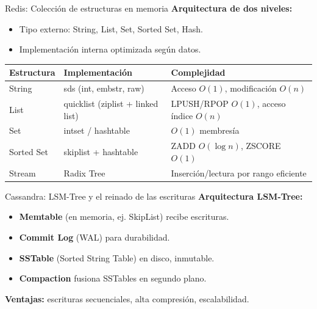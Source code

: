 \documentclass[aspectratio=169, 10pt, xcolor=table]{beamer}
\begin{document}
\begin{frame}{Redis: Colección de estructuras en memoria}
    \textbf{Arquitectura de dos niveles:}
    \begin{itemize}
        \item Tipo externo: String, List, Set, Sorted Set, Hash.
        \item Implementación interna optimizada según datos.
    \end{itemize}
    \begin{table}
        \centering
        \begin{tabular}{l|l|l}
            \toprule
            \textbf{Estructura} & \textbf{Implementación} & \textbf{Complejidad} \\
            \midrule
            String & sds (int, embstr, raw) & Acceso $O(1)$, modificación $O(n)$ \\
            List & quicklist (ziplist + linked list) & LPUSH/RPOP $O(1)$, acceso índice $O(n)$ \\
            Set & intset / hashtable & $O(1)$ membresía \\
            Sorted Set & skiplist + hashtable & ZADD $O(\log n)$, ZSCORE $O(1)$ \\
            Stream & Radix Tree & Inserción/lectura por rango eficiente \\
            \bottomrule
        \end{tabular}
    \end{table}
\end{frame}

\begin{frame}{Cassandra: LSM-Tree y el reinado de las escrituras}
    \textbf{Arquitectura LSM-Tree:}
    \begin{itemize}
        \item \textbf{Memtable} (en memoria, ej. SkipList) recibe escrituras.
        \item \textbf{Commit Log} (WAL) para durabilidad.
        \item \textbf{SSTable} (Sorted String Table) en disco, inmutable.
        \item \textbf{Compaction} fusiona SSTables en segundo plano.
    \end{itemize}
    \vspace{0.2cm}
    \textbf{Ventajas:} escrituras secuenciales, alta compresión, escalabilidad.
\end{frame}
\end{document}
